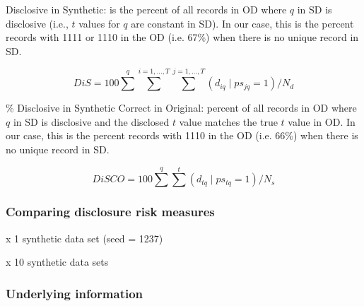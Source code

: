 \documentclass[t,8pt,utfx8]{beamer}
\begin{document}
\begin{spacing}{1.25}
{Disclosive in Synthetic: is the percent of all records in OD where  $q$ in SD is disclosive (i.e.,  $t$  values for  $q$  are constant in SD).  In our case, this is the percent records with 1111 or 1110 in the OD (i.e. 67\%) when there is no unique record in SD.

\begin{equation}
DiS = 100 \sum^{q} \sum^{i=1,\dots,T} \sum^{j=1,\dots,T} (d_{iq} \mid ps_{jq} = 1) / N_{d}
\end{equation}

\% Disclosive in Synthetic Correct in Original: percent of all records in OD where  $q$ in SD is disclosive and the disclosed  $t$  value matches the true  $t$  value in OD.  In our case, this is the percent records with 1110 in the OD (i.e. 66\%) when there is no unique record in SD.

\begin{equation}
DiSCO = 100 \sum^{q} \sum^{t} (d_{tq} \mid ps_{tq} = 1) / N_{s}
\end{equation}

}

\begin{frame}[fragile]
\frametitle{Comparing disclosure risk measures}

\begin{minipage}[t]{0.48\textwidth}
    \begin{table}[]
        \centering
        \caption{x 1 synthetic data set (seed = 1237)}
        
        \label{table:disclosure_risk_1}
    \end{table}
\end{minipage}%
\hfill%
\begin{minipage}[t]{0.48\textwidth}
    \begin{table}[]
        \centering
        \caption{x 10 synthetic data sets}
        
        \label{table:disclosure_risk_10}
    \end{table}
\end{minipage}
\end{frame}


\begin{frame}[fragile]
\frametitle{Underlying information}


\end{frame}
\end{spacing}
\end{document}
